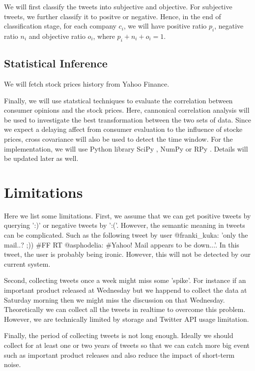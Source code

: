 \documentclass[12pt]{article}
\begin{document}
We will first classify the tweets into subjective and objective. For subjective tweets, we further classify it to positve or negative. Hence, in the end of classification stage, for each company $c_i$, we will have positive ratio $p_i$, negative ratio $n_i$ and objective ratio $o_i$, where $p_i + n_i + o_i = 1$.

\subsection{Statistical Inference}\label{statistical-inference}
We will fetch stock prices history from Yahoo Finance.

Finally, we will use statstical techniques to evaluate the correlation between consumer opinions and the stock prices. Here, cannonical correlation analysis will be used to investigate the best transformation between the two sets of data. Since we expect a delaying affect from consumer evaluation to the influence of stocke prices, cross covariance will also be used to detect the time window. For the implementation, we will use Python library SciPy \cite{SciPy}, NumPy \cite{NumPy} or RPy \cite{RPy}. Details will be updated later as well.

\section{Limitations}
Here we list some limitations. First, we assume that we can get positive tweets by querying ':)' or negative tweets by ':('. However, the semantic meaning in tweets can be complicated. Such as the following tweet by user @franki\_kuka: 'only the mail..? ;)) \#FF RT @asphodelia: \#Yahoo! Mail appears to be down...'. In this tweet, the user is probably being ironic. However, this will not be detected by our current system.

Second, collecting tweets once a week might miss some 'spike'. For instance if an important product released at Wednesday but we happend to collect the data at Saturday morning then we might miss the discussion on that Wednesday. Theoretically we can collect all the tweets in realtime to overcome this problem. However, we are technically limited by storage and Twitter API usage limitation.

Finally, the period of collecting tweets is not long enough. Ideally we should collect for at least one or two years of tweets so that we can catch more big event such as important product releases and also reduce the impact of short-term noise.



\end{document}
